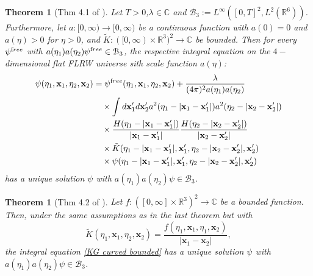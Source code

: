 \documentclass[b5paper,draft,openbib,12pt]{memoir}
\newtheorem{Thm}[Def]{Theorem}
\newcommand{\vx}{\mathbf{x}}
\newcommand{\free}{{\textup free}}
\begin{document}
\begin{Thm}[Thm 4.1 of \cite{lienertcurved}]
Let \(T>0\),\(\lambda\in\mathbb{C}\) and 
\(\mathcal{B}_3:=L^\infty([0,T]^2,L^2(\mathbb{R}^6))\). Furthermore, let \(a:[0,\infty)\rightarrow [0,\infty)\)
be a continuous function with \(a(0)=0\) and 
\(a(\eta)>0\) for \(\eta>0\), and 
\(\tilde{K}:([0,\infty)\times \mathbb{R}^{3})^2\rightarrow \mathbb{C}\)
be bounded. Then for every \(\psi^\free\) with 
\(a(\eta_1)a(\eta_2)\psi^\free\in \mathcal{B}_3 \),
the respective integral equation on the \(4-\)dimensional 
flat FLRW universe sith scale function \(a(\eta)\): 
\begin{align}\label{KG curved bounded}
  \psi(\eta_1, \vx_1,\eta_2,\vx_2)&=\psi^{\free}(\eta_1, \vx_1,\eta_2,\vx_2)
  +\frac{\lambda}{(4\pi)^2 a(\eta_1)a(\eta_2)}\\\notag
  &\quad \times \int d \vx_1' d \vx_2' 
  a^2(\eta_1-|\vx_1-\vx_1'|)a^2(\eta_2-|\vx_2-\vx_2'|)\\\notag
  &\quad \times \frac{H(\eta_1-|\vx_1-\vx_1'|)}{|\vx_1-\vx_1'|}
  \frac{H(\eta_2-|\vx_2-\vx_2'|)}{|\vx_2-\vx_2'|}\\\notag
  &\quad\times \tilde{K}(\eta_1-|\vx_1-\vx_1'|,\vx_1',\eta_2-|\vx_2-\vx_2'|,\vx_2')\\\notag
  &\quad\times \psi(\eta_1-|\vx_1-\vx_1'|,\vx_1',\eta_2-|\vx_2-\vx_2'|,\vx_2')
\end{align}
has a unique solution \(\psi\) with 
\(a(\eta_1)a(\eta_2)\psi\in \mathcal{B}_3\).
\end{Thm}

\begin{Thm}[Thm 4.2 of \cite{lienertcurved}]
  Let \(f:([0,\infty]\times \mathbb{R}^3)^2\rightarrow \mathbb{C}\) 
  be a bounded function. Then, under the same assumptions as in 
  the last theorem but with 
  \begin{equation}
  \tilde{K}(\eta_1,\vx_1,\eta_2,\vx_2)=\frac{f(\eta_1,\vx_1,\eta_1,\vx_2)}{|\vx_1-\vx_2|},
  \end{equation}
the integral equation \eqref{KG curved bounded} has a unique solution
\(\psi\) with 
\(a(\eta_1)a(\eta_2)\psi\in \mathcal{B}_3\). 
\end{Thm}




\end{document}
